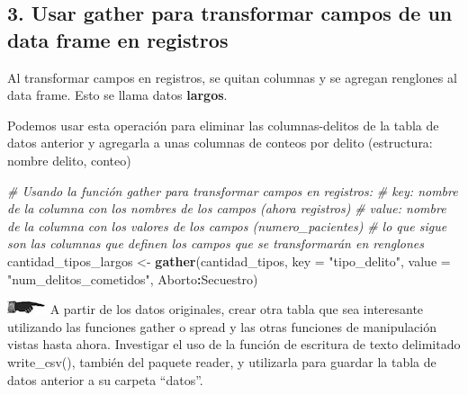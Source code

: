 \documentclass[]{book}
\newenvironment{Shaded}{\begin{snugshade}}{\end{snugshade}}
\newcommand{\KeywordTok}[1]{\textcolor[rgb]{0.13,0.29,0.53}{\textbf{#1}}}
\newcommand{\DataTypeTok}[1]{\textcolor[rgb]{0.13,0.29,0.53}{#1}}
\newcommand{\StringTok}[1]{\textcolor[rgb]{0.31,0.60,0.02}{#1}}
\newcommand{\CommentTok}[1]{\textcolor[rgb]{0.56,0.35,0.01}{\textit{#1}}}
\newcommand{\OtherTok}[1]{\textcolor[rgb]{0.56,0.35,0.01}{#1}}
\newcommand{\OperatorTok}[1]{\textcolor[rgb]{0.81,0.36,0.00}{\textbf{#1}}}
\newcommand{\NormalTok}[1]{#1}
\theoremstyle{definition}
\theoremstyle{definition}
\theoremstyle{definition}
\theoremstyle{remark}
\begin{document}
\begin{Shaded}
\end{Shaded}

\subsection{3. Usar gather para transformar campos de un data frame en
registros}\label{usar-gather-para-transformar-campos-de-un-data-frame-en-registros}

Al transformar campos en registros, se quitan columnas y se agregan
renglones al data frame. Esto se llama datos \textbf{largos}.

Podemos usar esta operación para eliminar las columnas-delitos de la
tabla de datos anterior y agregarla a unas columnas de conteos por
delito (estructura: nombre delito, conteo)

\begin{Shaded}
\begin{Highlighting}[]
\CommentTok{# Usando la función gather para transformar campos en registros:}
\CommentTok{# key: nombre de la columna con los nombres de los campos (ahora registros)}
\CommentTok{# value: nombre de la columna con los valores de los campos (numero_pacientes)}
\CommentTok{# lo que sigue son las columnas que definen los campos que se transformarán en renglones}
\NormalTok{cantidad_tipos_largos <-}\StringTok{ }\KeywordTok{gather}\NormalTok{(cantidad_tipos, }
                                \DataTypeTok{key =} \StringTok{"tipo_delito"}\NormalTok{, }
                                \DataTypeTok{value =} \StringTok{"num_delitos_cometidos"}\NormalTok{,}
\NormalTok{                                Aborto}\OperatorTok{:}\NormalTok{Secuestro)}
\end{Highlighting}
\end{Shaded}

\includegraphics{./imagenes/manicule2.jpg} A partir de los datos
originales, crear otra tabla que sea interesante utilizando las
funciones gather o spread y las otras funciones de manipulación vistas
hasta ahora. Investigar el uso de la función de escritura de texto
delimitado write\_csv(), también del paquete reader, y utilizarla para
guardar la tabla de datos anterior a su carpeta ``datos''.
\end{document}
